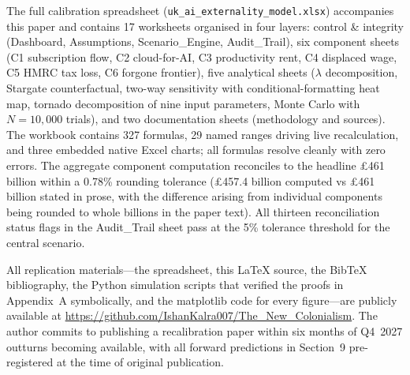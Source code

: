 \documentclass[11pt,letterpaper]{article}
\theoremstyle{remark}
\begin{document}
The full calibration spreadsheet (\texttt{uk\_ai\_externality\_model.xlsx}) accompanies this paper and contains 17 worksheets organised in four layers: control \& integrity (Dashboard, Assumptions, Scenario\_Engine, Audit\_Trail), six component sheets (C1 subscription flow, C2 cloud-for-AI, C3 productivity rent, C4 displaced wage, C5 HMRC tax loss, C6 forgone frontier), five analytical sheets ($\lambda$ decomposition, Stargate counterfactual, two-way sensitivity with conditional-formatting heat map, tornado decomposition of nine input parameters, Monte Carlo with $N=10{,}000$ trials), and two documentation sheets (methodology and sources). The workbook contains 327 formulas, 29 named ranges driving live recalculation, and three embedded native Excel charts; all formulas resolve cleanly with zero errors. The aggregate component computation reconciles to the headline \pounds461 billion within a 0.78\% rounding tolerance (\pounds457.4 billion computed vs \pounds461 billion stated in prose, with the difference arising from individual components being rounded to whole billions in the paper text). All thirteen reconciliation status flags in the Audit\_Trail sheet pass at the 5\% tolerance threshold for the central scenario.

All replication materials---the spreadsheet, this \LaTeX{} source, the BibTeX bibliography, the Python simulation scripts that verified the proofs in Appendix~A symbolically, and the matplotlib code for every figure---are publicly available at \url{https://github.com/IshanKalra007/The_New_Colonialism}. The author commits to publishing a recalibration paper within six months of Q4~2027 outturns becoming available, with all forward predictions in Section~9 pre-registered at the time of original publication.



\end{document}
